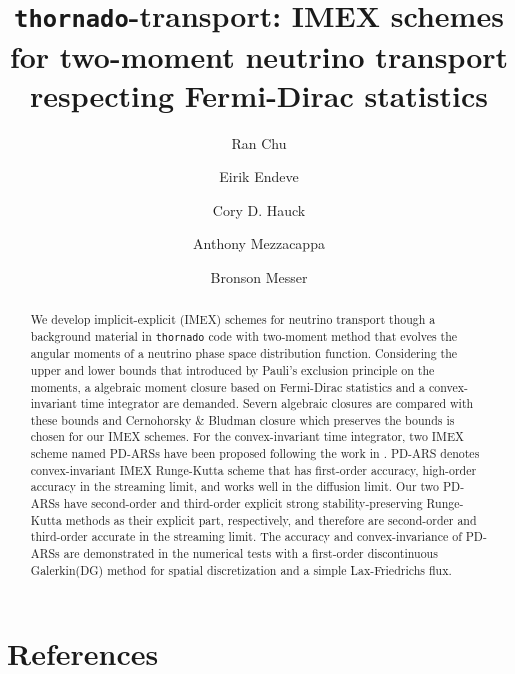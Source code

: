 \documentclass[a4paper]{jpconf}
\begin{document}
\title{\texttt{thornado}-transport: IMEX schemes for two-moment neutrino transport respecting Fermi-Dirac statistics}

\author{Ran Chu}
\address{Department of Physics and Astronomy, University of Tennessee Knoxville, TN 37996-1200}

\author{Eirik Endeve}
\address{Computational and Applied Mathematics Group, Oak Ridge National Laboratory, Oak Ridge, TN 37831 USA}
\address{Department of Physics and Astronomy, University of Tennessee Knoxville, TN 37996-1200}

\author{Cory D. Hauck}
\address{Computational and Applied Mathematics Group, Oak Ridge National Laboratory, Oak Ridge, TN 37831 USA}
\address{Department of Mathematics, University of Tennessee Knoxville, TN 37996-1320}

\author{Anthony Mezzacappa}
\address{Department of Physics and Astronomy, University of Tennessee Knoxville, TN 37996-1200}

\author{Bronson Messer}
\address{Scientific Computing and Theoretical Physics Groups, Oak Ridge National Laboratory, Oak Ridge, TN 37831 USA}
\address{Department of Physics and Astronomy, University of Tennessee Knoxville, TN 37996-1200}

\begin{abstract}
We develop implicit-explicit (IMEX) schemes for neutrino transport though a background material in \texttt{thornado} code with two-moment method that evolves the angular moments of a neutrino phase space distribution function.
Considering the upper and lower bounds that introduced by Pauli's exclusion principle on the moments, a algebraic moment closure based on Fermi-Dirac statistics and a convex-invariant time integrator are demanded.
Severn algebraic closures are compared with these bounds and Cernohorsky \& Bludman closure\cite{cernohorskyBludman_1994} which preserves the bounds is chosen for our IMEX schemes.
For the convex-invariant time integrator, two IMEX scheme named PD-ARSs have been proposed following the work in \cite{chu_etal_2018}.
PD-ARS denotes convex-invariant IMEX Runge-Kutta scheme that has first-order accuracy, high-order accuracy in the streaming limit, and works well in the diffusion limit.
Our two PD-ARSs have second-order and third-order explicit strong stability-preserving Runge-Kutta methods\cite{gottlieb_etal_2001} as their explicit part, respectively, and therefore are second-order and third-order accurate in the streaming limit.
The accuracy and convex-invariance of PD-ARSs are demonstrated in the numerical tests with a first-order discontinuous Galerkin(DG) method for spatial discretization and a simple Lax-Friedrichs flux.

\end{abstract}








\section*{References}

\end{document}
